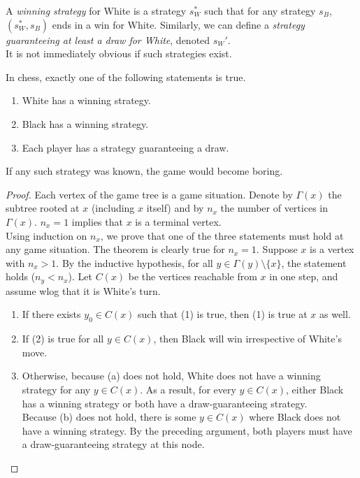 	A \emph{winning strategy} for White is a strategy $s_W^*$ such that for any strategy $s_B$, $(s_W^*,s_B)$ ends in a win for White. Similarly, we can define a \emph{strategy guaranteeing at least a draw for White}, denoted $s_W'$.\\
	It is not immediately obvious if such strategies exist.

	\begin{ftheo}
		In chess, exactly one of the following statements is true.
		\begin{enumerate}[label=(\arabic*)]
			\item White has a winning strategy.
			\item Black has a winning strategy.
			\item Each player has a strategy guaranteeing a draw.
		\end{enumerate}
	\end{ftheo}

	If any such strategy was known, the game would become boring.

	\begin{proof}
		Each vertex of the game tree is a game situation. Denote by $\Gamma(x)$ the subtree rooted at $x$ (including $x$ itself) and by $n_x$ the number of vertices in $\Gamma(x)$. $n_x = 1$ implies that $x$ is a terminal vertex.\\
		Using induction on $n_x$, we prove that one of the three statements must hold at any game situation. The theorem is clearly true for $n_x = 1$. Suppose $x$ is a vertex with $n_x > 1$. By the inductive hypothesis, for all $y \in \Gamma(y) \setminus \{x\}$, the statement holds ($n_y < n_x$). Let $C(x)$ be the vertices reachable from $x$ in one step, and assume wlog that it is White's turn.
		\begin{enumerate}[label=(\alph*)]
			\item If there exists $y_0 \in C(x)$ such that (1) is true, then (1) is true at $x$ as well.
			\item If (2) is true for all $y \in C(x)$, then Black will win irrespective of White's move.
			\item Otherwise, because (a) does not hold, White does not have a winning strategy for any $y \in C(x)$. As a result, for every $y \in C(x)$, either Black has a winning strategy or both have a draw-guaranteeing strategy.\\
			Because (b) does not hold, there is some $y \in C(x)$ where Black does not have a winning strategy. By the preceding argument, both players must have a draw-guaranteeing strategy at this node.
		\end{enumerate}
	\end{proof}

